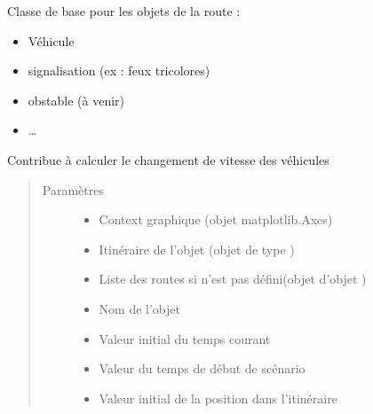 \documentclass[a4paper,10pt,french]{sphinxmanual}
\begin{document}
\begin{fulllineitems}
\label{\detokenize{road_objects/road_item:road_objects.road_item.RoadItem}}
Classe de base pour les objets de la route :
\begin{itemize}
\item {} 
Véhicule

\item {} 
signalisation (ex : feux tricolores)

\item {} 
obstable (à venir)

\item {} 
…

\end{itemize}

Contribue à calculer le changement de vitesse des véhicules
\begin{quote}\begin{description}
\item[{Paramètres}] \leavevmode\begin{itemize}
\item {} 
 \textendash{} Context graphique (objet matplotlib.Axes)

\item {} 
 \textendash{} Itinéraire de l’objet  (objet de type )

\item {} 
 \textendash{} Liste des routes si  n’est pas défini(objet  d’objet )

\item {} 
 \textendash{} Nom de l’objet 

\item {} 
 \textendash{} Valeur initial du temps courant

\item {} 
 \textendash{} Valeur du temps de début de scénario

\item {} 
 \textendash{} Valeur initial de la position dans l’itinéraire


\end{itemize}
\end{description}
\end{quote}
\end{fulllineitems}
\end{document}
